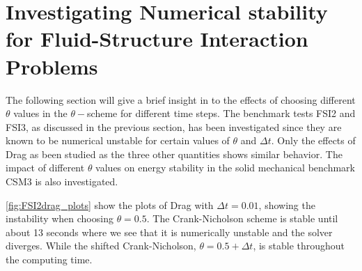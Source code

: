 \section{Investigating Numerical stability for Fluid-Structure Interaction Problems}
The following section will give a brief insight in to the effects of choosing different $\theta$ values in the $\theta-$scheme for different time steps. 
The benchmark tests FSI2 and FSI3, as discussed in the previous section, has been investigated since they are known to be numerical unstable for certain values of $\theta$ and $\Delta t$. Only the effects of Drag as been studied as the three other quantities shows similar behavior. 
The impact of different $\theta$ values on energy stability in the solid mechanical benchmark CSM3 is also investigated.\newline

\ref{fig:FSI2drag_plots} show the plots of Drag with $\Delta t = 0.01$, showing the instability when choosing $\theta = 0.5$. The Crank-Nicholson scheme is stable until about 13 seconds where we see that it is numerically unstable and the solver diverges. While the shifted Crank-Nicholson, $\theta = 0.5 + \Delta t$, is stable throughout the computing time.\newline

